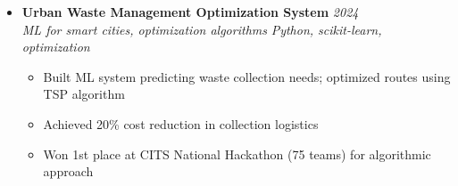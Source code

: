 \documentclass[a4paper,11pt]{article}
\begin{document}
\begin{itemize}[leftmargin=*, label={-}]
\item \textbf{Urban Waste Management Optimization System} \hfill \textit{2024} \\
\textit{ML for smart cities, optimization algorithms} \hfill \textit{Python, scikit-learn, optimization}
\vspace{-2pt}
    \begin{itemize}[leftmargin=0.4cm, nosep, label=\tiny$\bullet$]
        \item \small{Built ML system predicting waste collection needs; optimized routes using TSP algorithm}
        \item \small{Achieved 20\% cost reduction in collection logistics}
        \item \small{Won 1st place at CITS National Hackathon (75 teams) for algorithmic approach}
    \end{itemize}
\vspace{3pt}

\end{itemize}
\end{document}
